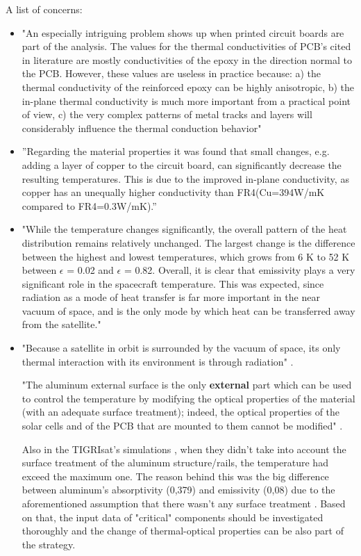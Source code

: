 \documentclass[final]{cubedoc}
\begin{document}
	A list of concerns:
	
	\begin{itemize}
		\item "An especially intriguing problem shows up when printed circuit boards are part of the analysis. The values for the thermal conductivities of PCB’s cited in literature are mostly conductivities of the epoxy in the direction normal to the PCB. However, these values are useless in practice because: a) the thermal conductivity of the reinforced epoxy can be highly anisotropic, b) the in-plane thermal conductivity is much more important from a practical point of view, c) the very complex patterns of metal tracks and layers will considerably influence the thermal conduction behavior" \cite{lasance2002}
		\item ”Regarding the material properties it was found that small changes, e.g.  adding a layer of copper to the circuit board, can significantly decrease the resulting temperatures.  This is due to the improved in-plane conductivity, as copper has an unequally higher conductivity than FR4(Cu=394W/mK compared to FR4=0.3W/mK).” \cite{reiss2012} 
		\item "While the temperature changes significantly, the overall pattern of the heat distribution remains relatively unchanged. The largest change is the difference between the highest and lowest temperatures, which grows from 6 K to 52 K between $\epsilon$ = 0.02 and $\epsilon$ = 0.82. Overall, it is clear that emissivity plays a very significant role in the spacecraft temperature. This was expected, since radiation as a mode of heat transfer is far more important in the near vacuum of space, and is the only mode by which heat can be transferred away from the satellite." \cite{peake2014cubesat}
		\item "Because a satellite in orbit is surrounded by the vacuum of space, its only
		thermal interaction with its environment is through radiation" \cite{vanoutryve2008}.
		
		"The aluminum external surface is the only \textbf{external} part which can be used to control the temperature by modifying the optical properties of the material (with an adequate surface treatment); indeed, the optical properties of the solar cells and of the PCB that are mounted to them cannot be modified" \cite{paris2015}.
		
		Also in the TIGRIsat's simulations , when they didn't take into account the surface treatment of the aluminum structure/rails, the temperature had exceed the maximum one. The reason behind this was the big difference between aluminum's absorptivity (0,379) and emissivity (0,08) due to the aforementioned assumption that there wasn't any surface treatment \cite{paris2015}. Based on that, the input data of "critical" components should be investigated thoroughly and the change of thermal-optical properties can be also part of the strategy.
	\end{itemize}
	
\end{document}
